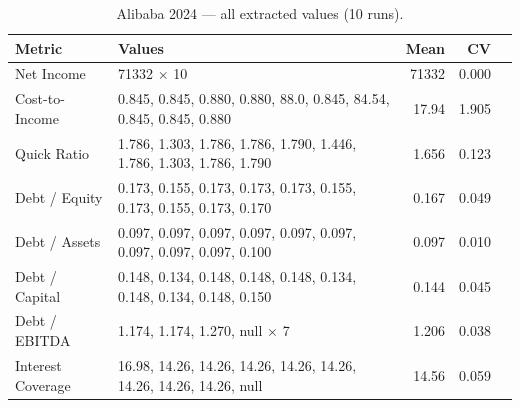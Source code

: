 \documentclass[12pt, a4paper]{article}
\newcommand{\cmark}{\textcolor{green!60!black}{\ding{51}}}  %
\newcommand{\xmark}{\textcolor{red!70!black}{\ding{55}}}    %
\begin{document}
\begin{table}[H]
\centering\small
\caption{Alibaba 2024 --- all extracted values (10 runs).}
\label{tab:ali-raw}
\begin{tabular}{lp{8.5cm}rrc}
\toprule
\textbf{Metric} & \textbf{Values} & \textbf{Mean} & \textbf{CV} & \\
\midrule
Net Income         & 71332 $\times$ 10                                                & 71332 & 0.000 & \cmark \\
Cost-to-Income     & 0.845, 0.845, 0.880, 0.880, 88.0, 0.845, 84.54, 0.845, 0.845, 0.880 & 17.94 & 1.905 & \xmark \\
Quick Ratio        & 1.786, 1.303, 1.786, 1.786, 1.790, 1.446, 1.786, 1.303, 1.786, 1.790 & 1.656 & 0.123 & \xmark \\
Debt / Equity      & 0.173, 0.155, 0.173, 0.173, 0.173, 0.155, 0.173, 0.155, 0.173, 0.170 & 0.167 & 0.049 & \cmark \\
Debt / Assets      & 0.097, 0.097, 0.097, 0.097, 0.097, 0.097, 0.097, 0.097, 0.097, 0.100 & 0.097 & 0.010 & \cmark \\
Debt / Capital     & 0.148, 0.134, 0.148, 0.148, 0.148, 0.134, 0.148, 0.134, 0.148, 0.150 & 0.144 & 0.045 & \cmark \\
Debt / EBITDA      & 1.174, 1.174, 1.270, null $\times$ 7                              & 1.206 & 0.038 & \xmark \\
Interest Coverage  & 16.98, 14.26, 14.26, 14.26, 14.26, 14.26, 14.26, 14.26, 14.26, null & 14.56 & 0.059 & \xmark \\
\bottomrule
\end{tabular}
\end{table}
\end{document}
